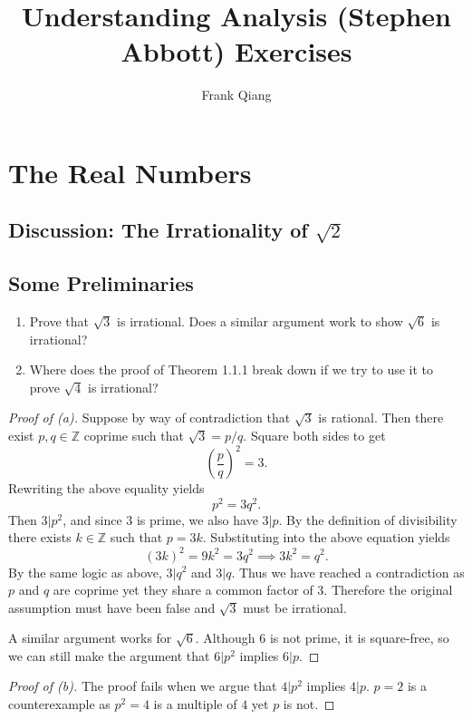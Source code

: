 \documentclass[12pt, letterpaper]{article}
\title{Understanding Analysis (Stephen Abbott) Exercises}
\author{Frank Qiang}
\newcommand{\Z}{\mathbb{Z}}
\begin{document}
\maketitle

\section{The Real Numbers}
\subsection{Discussion: The Irrationality of $\sqrt{2}$}
\subsection{Some Preliminaries}
\begin{tcolorbox}[title=Exercise 1.2.1.]
  \begin{enumerate}[label=(\alph*)]
    \item Prove that $\sqrt{3}$ is irrational. Does a
      similar argument work to show $\sqrt{6}$ is
      irrational?
    \item Where does the proof of Theorem 1.1.1 break
      down if we try to use it to prove $\sqrt{4}$ is
      irrational?
  \end{enumerate}
\end{tcolorbox}
\begin{proof}[Proof of (a)]
  Suppose by way of contradiction that $\sqrt{3}$ is
  rational. Then there exist $p, q \in \Z$ coprime such
  that $\sqrt{3} = p/q$. Square both sides to get
  \[{\left(\frac{p}{q}\right)}^2 = 3.\]
  Rewriting the above equality yields
  \[p^2 = 3q^2.\]
  Then $3 | p^2$, and since $3$ is prime, we also have $3 | p$. By the
  definition of divisibility there exists $k \in \Z$ such that
  $p = 3k$. Substituting into the above equation yields
  \[(3k)^2 = 9k^2 = 3q^2 \implies 3k^2 = q^2.\]
  By the same logic as above, $3 | q^2$ and $3 | q$. Thus we have
  reached a contradiction as $p$ and $q$ are coprime yet they share a
  common factor of 3. Therefore the original
  assumption must have been false and $\sqrt{3}$ must be irrational.

  A similar argument works for $\sqrt{6}$. Although $6$ is not prime, it
  is square-free, so we can still make the argument that $6 | p^2$
  implies $6 | p$.
\end{proof}

\begin{proof}[Proof of (b)]
  The proof fails when we argue that $4 | p^2$ implies $4 | p$. $p = 2$
  is a counterexample as $p^2 = 4$ is a multiple of $4$ yet $p$ is not.
\end{proof}
\end{document}
